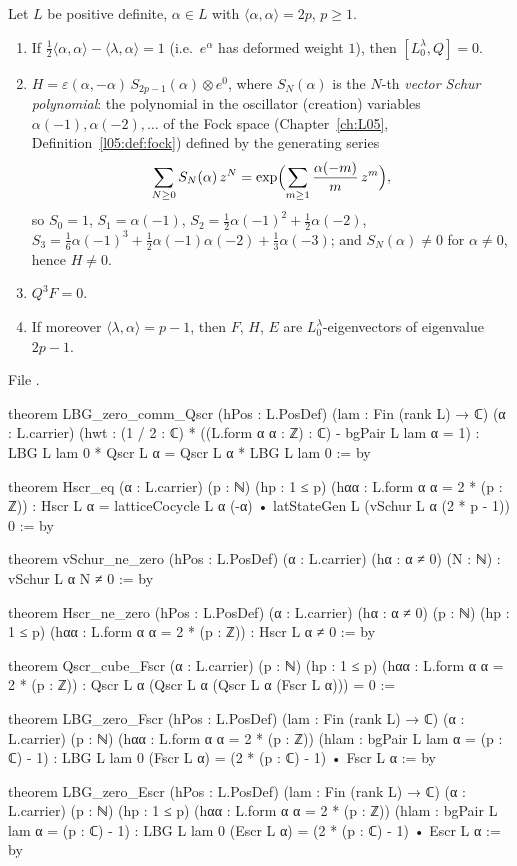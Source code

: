 \begin{theorem}\label{l18:thm:screen}
Let $L$ be positive definite, $\alpha\in L$ with $\langle\alpha,\alpha\rangle=2p$, $p\ge1$.
\begin{enumerate}
\item If $\frac12\langle\alpha,\alpha\rangle-\langle\lambda,\alpha\rangle=1$ (i.e.\ $e^\alpha$ has deformed weight $1$),
  then $[L^\lambda_0,Q]=0$.
\item $H=\varepsilon(\alpha,-\alpha)\,S_{2p-1}(\alpha)\otimes e^0$, where $S_N(\alpha)$ is the $N$-th
  \emph{vector Schur polynomial}: the polynomial in the oscillator (creation) variables
  $\alpha(-1),\alpha(-2),\dots$ of the Fock space (Chapter~\ref{ch:L05}, Definition~\ref{l05:def:fock})
  defined by the generating series
  \begin{equation}\label{l18:eq:schur}
  \sum_{N\ge0}S_N(\alpha)\,z^N=\exp\Bigl(\sum_{m\ge1}\frac{\alpha(-m)}{m}\,z^m\Bigr),
  \end{equation}
  so $S_0=1$, $S_1=\alpha(-1)$, $S_2=\frac12\alpha(-1)^2+\frac12\alpha(-2)$,
  $S_3=\frac16\alpha(-1)^3+\frac12\alpha(-1)\alpha(-2)+\frac13\alpha(-3)$; and $S_N(\alpha)\ne0$ for
  $\alpha\ne0$, hence $H\ne0$.
\item $Q^3F=0$.
\item If moreover $\langle\lambda,\alpha\rangle=p-1$, then $F$, $H$, $E$ are $L^\lambda_0$-eigenvectors of eigenvalue $2p-1$.
\end{enumerate}
\end{theorem}
\noindent File .
\begin{leancode}
theorem LBG_zero_comm_Qscr (hPos : L.PosDef) (lam : Fin (rank L) → ℂ) (α : L.carrier)
    (hwt : (1 / 2 : ℂ) * ((L.form α α : ℤ) : ℂ) - bgPair L lam α = 1) :
    LBG L lam 0 * Qscr L α = Qscr L α * LBG L lam 0 := by

theorem Hscr_eq (α : L.carrier) (p : ℕ) (hp : 1 ≤ p) (hαα : L.form α α = 2 * (p : ℤ)) :
    Hscr L α = latticeCocycle L α (-α) • latStateGen L (vSchur L α (2 * p - 1)) 0 := by

theorem vSchur_ne_zero (hPos : L.PosDef) (α : L.carrier) (hα : α ≠ 0) (N : ℕ) :
    vSchur L α N ≠ 0 := by

theorem Hscr_ne_zero (hPos : L.PosDef) (α : L.carrier) (hα : α ≠ 0) (p : ℕ) (hp : 1 ≤ p)
    (hαα : L.form α α = 2 * (p : ℤ)) : Hscr L α ≠ 0 := by

theorem Qscr_cube_Fscr (α : L.carrier) (p : ℕ) (hp : 1 ≤ p) (hαα : L.form α α = 2 * (p : ℤ)) :
    Qscr L α (Qscr L α (Qscr L α (Fscr L α))) = 0 :=

theorem LBG_zero_Fscr (hPos : L.PosDef) (lam : Fin (rank L) → ℂ) (α : L.carrier) (p : ℕ)
    (hαα : L.form α α = 2 * (p : ℤ)) (hlam : bgPair L lam α = (p : ℂ) - 1) :
    LBG L lam 0 (Fscr L α) = (2 * (p : ℂ) - 1) • Fscr L α := by

theorem LBG_zero_Escr (hPos : L.PosDef) (lam : Fin (rank L) → ℂ) (α : L.carrier) (p : ℕ)
    (hp : 1 ≤ p) (hαα : L.form α α = 2 * (p : ℤ)) (hlam : bgPair L lam α = (p : ℂ) - 1) :
    LBG L lam 0 (Escr L α) = (2 * (p : ℂ) - 1) • Escr L α := by
\end{leancode}
